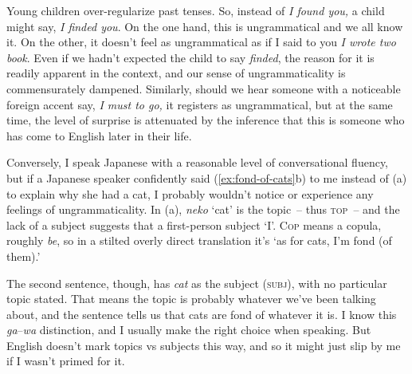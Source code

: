Young children over-regularize past tenses. So, instead of \textit{I found you,} a child might say, \textit{I finded you}. On the one hand, this is ungrammatical and we all know it. On the other, it doesn't feel as ungrammatical as if I said to you \textit{I wrote two book}. Even if we hadn't expected the child to say \textit{finded}, the reason for it is readily apparent in the context, and our sense of ungrammaticality is commensurately dampened. Similarly, should we hear someone with a noticeable foreign accent say, \textit{I must to go,} it registers as ungrammatical, but at the same time, the level of surprise is attenuated by the inference that this is someone who has come to English later in their life.

Conversely, I speak Japanese with a reasonable level of conversational fluency, but if a Japanese speaker confidently said (\ref{ex:fond-of-cats}b) to me instead of (a) to explain why she had a cat, I probably wouldn't notice or experience any feelings of ungrammaticality. In (a), \textit{neko} `cat' is the topic~-- thus \textsc{top}~-- and the lack of a subject suggests that a first-person subject `I'. \textsc{Cop} means a copula, roughly \textit{be}, so in a stilted overly direct translation it's `as for cats, I'm fond (of them).'

\ea\label{ex:fond-of-cats}
    \z
\z

The second sentence, though, has \textit{cat} as the subject (\textsc{subj}), with no particular topic stated. That means the topic is probably whatever we've been talking about, and the sentence tells us that cats are fond of whatever it is. I know this \textit{ga}--\textit{wa} distinction, and I usually make the right choice when speaking. But English doesn't mark topics vs subjects this way, and so it might just slip by me if I wasn't primed for it.

\bigskip

